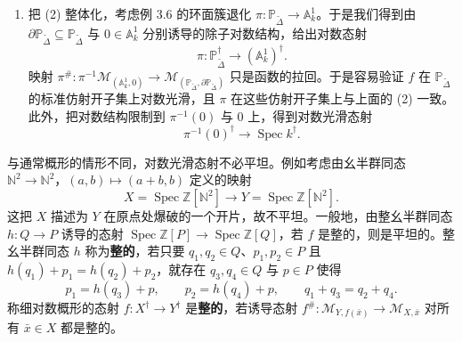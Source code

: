 \begin{examples}
\begin{enumerate}[label=(\arabic*),leftmargin=2.2em,itemsep=3pt]
\item 把 (2) 整体化，考虑例 3.6 的环面簇退化 $\pi:\mathbb{P}_{\tilde\Delta}\to\mathbb{A}^1_k$。于是我们得到由 $\partial\mathbb{P}_{\tilde\Delta}\subseteq\mathbb{P}_{\tilde\Delta}$ 与 $0\in\mathbb{A}^1_k$ 分别诱导的除子对数结构，给出对数态射
\[
  \pi:\mathbb{P}_{\tilde\Delta}^{\dagger}\longrightarrow(\mathbb{A}^1_k)^{\dagger}.
\]
映射 $\pi^{\#}:\pi^{-1}\mathcal{M}_{(\mathbb{A}^1_k,0)}\to\mathcal{M}_{(\mathbb{P}_{\tilde\Delta},\partial\mathbb{P}_{\tilde\Delta})}$ 只是函数的拉回。于是容易验证 $f$ 在 $\mathbb{P}_{\tilde\Delta}$ 的标准仿射开子集上对数光滑，且 $\pi$ 在这些仿射开子集上与上面的 (2) 一致。此外，把对数结构限制到 $\pi^{-1}(0)$ 与 $0$ 上，得到对数光滑态射
\[
  \pi^{-1}(0)^{\dagger}\longrightarrow\operatorname{Spec} k^{\dagger}.
\]
\end{enumerate}
\end{examples}

\begin{remark}
与通常概形的情形不同，对数光滑态射不必平坦。例如考虑由幺半群同态 $\mathbb{N}^2\to\mathbb{N}^2$，$(a,b)\mapsto(a+b,b)$ 定义的映射
\[
  X=\operatorname{Spec}\mathbb{Z}[\mathbb{N}^2]\longrightarrow Y=\operatorname{Spec}\mathbb{Z}[\mathbb{N}^2].
\]
这把 $X$ 描述为 $Y$ 在原点处爆破的一个开片，故不平坦。一般地，由整幺半群同态 $h:Q\to P$ 诱导的态射 $\operatorname{Spec}\mathbb{Z}[P]\to\operatorname{Spec}\mathbb{Z}[Q]$，若 $f$ 是整的，则是平坦的。整幺半群同态 $h$ 称为\textbf{整的}，若只要 $q_1,q_2\in Q$、$p_1,p_2\in P$ 且 $h(q_1)+p_1=h(q_2)+p_2$，就存在 $q_3,q_4\in Q$ 与 $p\in P$ 使得
\[
  p_1=h(q_3)+p,\qquad p_2=h(q_4)+p,\qquad q_1+q_3=q_2+q_4.
\]
称细对数概形的态射 $f:X^{\dagger}\to Y^{\dagger}$ 是\textbf{整的}，若诱导态射 $f^{\#}:\mathcal{M}_{Y,f(\bar x)}\to\mathcal{M}_{X,\bar x}$ 对所有 $\bar x\in X$ 都是整的。
\end{remark}


